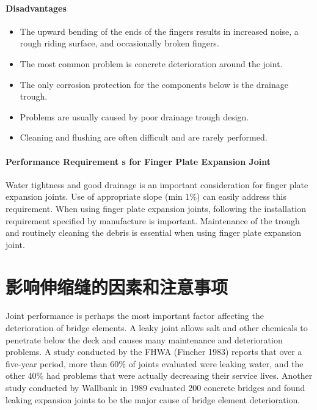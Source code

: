 \paragraph{Disadvantages}
\begin{itemize}
  \item The upward bending of the ends of the fingers results in increased noise, a rough riding surface, and
  occasionally broken fingers.
  \item  The most common problem is concrete deterioration around the joint.
  \item The only corrosion protection for the components below is the drainage trough.
  \item  Problems are usually caused by poor drainage trough design.
  \item Cleaning and flushing are often difficult and are rarely performed.
\end{itemize}

\paragraph{Performance Requirement s for Finger Plate Expansion Joint}

Water tightness and good drainage is an important consideration for finger plate expansion joints. Use of
appropriate slope (min 1\%) can easily address this requirement. When using finger plate expansion joints, following
the installation requirement specified by manufacture is important. Maintenance of the trough and routinely cleaning
the debris is essential when using finger plate expansion joint.


\section{影响伸缩缝的因素和注意事项}\label{sec:factors-joints-life}
Joint performance is perhaps the most important factor affecting the deterioration of bridge elements. A leaky
joint allows salt and other chemicals to penetrate below the deck and causes many maintenance and deterioration
problems. A study conducted by the FHWA (Fincher 1983) reports that over a five-year period, more than 60\% of
joints evaluated were leaking water, and the other 40\% had problems that were actually decreasing their service lives.
Another study conducted by Wallbank in 1989 evaluated 200 concrete bridges and found leaking expansion joints to
be the major cause of bridge element deterioration.

